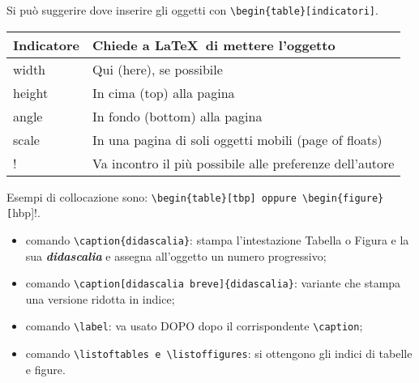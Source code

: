\documentclass{report}
\begin{document}
                    Si può suggerire dove inserire gli oggetti con \verb!\begin{table}[indicatori]!.

                    \begin{center}
                        \begin{tabular}{II}
                            \toprule
                            Indicatore &  Chiede a \LaTeX\ di mettere l'oggetto \\
                            \midrule
                            width & Qui (here), se possibile \\
                            height & In cima (top) alla pagina \\
                            angle & In fondo (bottom) alla pagina \\
                            scale & In una pagina di soli oggetti mobili (page of floats) \\
                            ! & Va incontro il più possibile alle preferenze dell'autore \\
                            \bottomrule
                        \end{tabular}
                    \end{center}

                    Esempi di collocazione sono: \verb!\begin{table}[tbp] oppure \begin{figure}[!hbp]!.
                    \begin{itemize}
                        \item comando \verb!\caption{didascalia}!: stampa l'intestazione Tabella o Figura e la sua \emph{\textbf{didascalia}} e assegna all'oggetto un numero progressivo;
                        \item comando \verb!\caption[didascalia breve]{didascalia}!: variante che stampa una versione ridotta in indice;
                        \item comando \verb!\label!: va usato DOPO dopo il corrispondente \verb!\caption!;
                        \item comando \verb!\listoftables e \listoffigures!: si ottengono gli indici di tabelle e figure.
                    \end{itemize}
                
\end{document}
